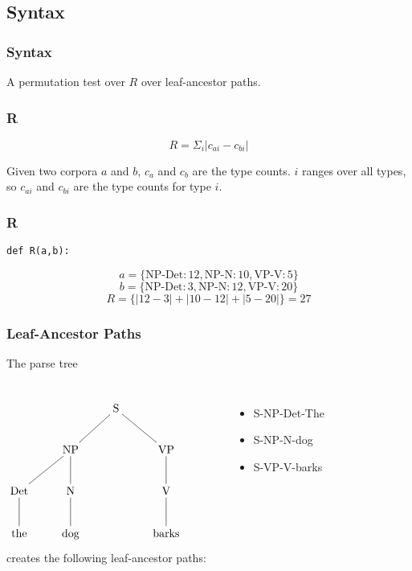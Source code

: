 \documentclass{beamer}
\begin{document}
\subsection{Syntax}
\begin{frame}
\frametitle{Syntax}
  A permutation test over $R$ over leaf-ancestor paths.
\end{frame}
\begin{frame}
\frametitle{R}
\begin{definition}
\begin{equation}
R = \Sigma_i |c_{ai} - c_{bi}|
\label{rmeasure}
\end{equation}
\end{definition}
\noindent{}Given two corpora $a$ and $b$, $c_a$ and $c_b$ are the type
counts. $i$ ranges over all types, so $c_{ai}$ and $c_{bi}$ are the
type counts for type $i$.
\end{frame}
\begin{frame}
\frametitle{R}
  \hspace{-1.0cm} {\tt def R(a,b):} \\
  \hspace{-0.6cm}{\tt sum(abs(ca-cb) for ca,cb in zip(a.values(), b.values()))}
  \begin{example}
    \[a=\{\textrm{NP-Det}:12, \textrm{NP-N}:10, \textrm{VP-V}:5\}\]
    \[b=\{\textrm{NP-Det}:3, \textrm{NP-N}:12, \textrm{VP-V}:20\}\]
    \[R = \{|12-3| + |10-12| + |5-20|\} = 27 \]
  \end{example}
\end{frame}
\begin{frame}
  \frametitle{Leaf-Ancestor Paths}
The parse tree
\begin{columns}
\[\xymatrix{
  &&\textrm{S} \ar@{-}[dl] \ar@{-}[dr] &&\\
  &\textrm{NP} \ar@{-}[d] \ar@{-}[dl] &&\textrm{VP} \ar@{-}[d]\\
  \textrm{Det} \ar@{-}[d] & \textrm{N} \ar@{-}[d] && \textrm{V} \ar@{-}[d] \\
\textrm{the}& \textrm{dog} && \textrm{barks}\\}
\]
creates the following leaf-ancestor paths:
\begin{itemize}
\item S-NP-Det-The
\item S-NP-N-dog
\item S-VP-V-barks
\end{itemize}
\end{columns}
\end{frame}
\end{document}
